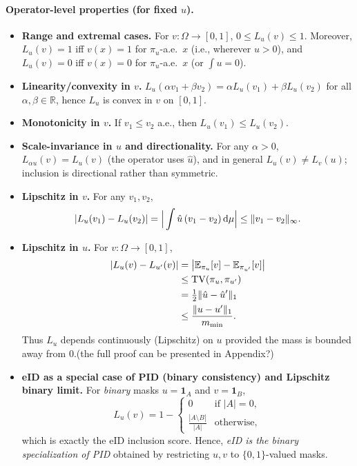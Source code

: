 \documentclass[review,journal]{vgtc}              %
\begin{document}
\paragraph{Operator-level properties (for fixed $u$).}
\begin{itemize}
\item \textbf{Range and extremal cases.} For $v:\Omega\to[0,1]$,
$0\le L_u(v)\le 1$. Moreover, $L_u(v)=1$ iff $v(x)=1$ for $\pi_u$-a.e.\ $x$
(i.e., wherever $u>0$), and $L_u(v)=0$ iff $v(x)=0$ for $\pi_u$-a.e.\ $x$
(or $\int u=0$).

\item \textbf{Linearity/convexity in $v$.} $L_u(\alpha v_1+\beta v_2)=\alpha L_u(v_1)+\beta L_u(v_2)$
for all $\alpha,\beta\in\mathbb{R}$, hence $L_u$ is convex in $v$ on $[0,1]$.

\item \textbf{Monotonicity in $v$.} If $v_1\le v_2$ a.e., then $L_u(v_1)\le L_u(v_2)$.

\item \textbf{Scale-invariance in $u$ and directionality.} For any $\alpha>0$,
$L_{\alpha u}(v)=L_u(v)$ (the operator uses $\hat u$), and in general
$L_u(v)\neq L_v(u)$; inclusion is directional rather than symmetric.

\item \textbf{Lipschitz in $v$.} For any $v_1,v_2$,
\[
|L_u(v_1)-L_u(v_2)|=\Big|\int \hat u\,(v_1-v_2)\,{\rm d}\mu\Big|
\le \|v_1-v_2\|_\infty .
\]

\item \textbf{Lipschitz in $u$.} For $v:\Omega\to[0,1]$,
\begin{align}
|L_u(v)-L_{u'}(v)| &= \big|\mathbb{E}_{\pi_u}[v]-\mathbb{E}_{\pi_{u'}}[v]\big| \notag \\
&\le \mathrm{TV}(\pi_u,\pi_{u'}) \notag \\
&= \tfrac12\|\hat u-\hat u'\|_{1} \notag \\
&\le \frac{\|u-u'\|_1}{m_{\min}} .
\end{align}
Thus $L_u$ depends continuously (Lipschitz) on $u$ provided the mass is bounded away from $0$.(the full proof can be presented in Appendix?)

\item \textbf{eID as a special case of PID (binary consistency) and Lipschitz binary limit.}
For \emph{binary} masks $u=\mathbf{1}_A$ and $v=\mathbf{1}_B$,
\begin{equation}
L_u(v) = 1 - 
\begin{cases} 
0 & \text{if } |A| = 0, \\
\frac{|A \setminus B|}{|A|} & \text{otherwise},
\end{cases}
\end{equation}
which is exactly the eID inclusion score. Hence, \emph{eID is the binary specialization of PID} obtained by restricting $u,v$ to $\{0,1\}$-valued masks.


\end{itemize}
\end{document}
